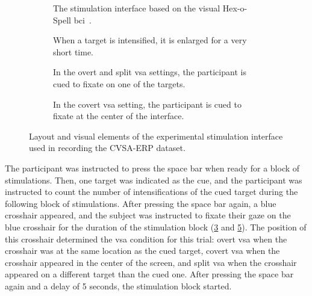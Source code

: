 \begin{figure}[t]
  \begin{subfigure}[t]{.45\textwidth}
    
    \caption[The stimulation interface.]{The stimulation interface based on the visual Hex-o-Spell
    \acs{bci}~\cite{Treder2010}.}%
    \label{fig:covert-align/interface/interface}
  \end{subfigure}\hfill%
  \begin{subfigure}[t]{.45\textwidth}
    
    \caption[Intensification.]{When a target is intensified, it is enlarged for
    a very short time.}%
    \label{fig:covert-align/interface/intensification}
  \end{subfigure}

  \bigskip

  \begin{subfigure}[t]{.45\textwidth}
    
    \caption[Gaze fixated on a target.]{In the overt and split \ac{vsa}
    settings, the
    participant is cued to fixate on one of the targets.}%
    \label{fig:covert-align/interface/overt}
  \end{subfigure}\hfill%
  \begin{subfigure}[t]{.45\textwidth}
    
    \caption[Gaze fixated centrally.]{In the covert \ac{vsa} setting, the participant is
    cued to fixate at the center of the interface.}%
    \label{fig:covert-align/interface/covert}
  \end{subfigure}
  \caption[Stimulation interface layout.]{Layout and visual elements of the experimental stimulation
  interface used in recording the CVSA-ERP dataset.}
\end{figure}

The participant was instructed to press the space bar when ready for a block
of stimulations.
Then, one target was indicated as the cue, and the participant
was instructed to count the number of intensifications of the cued target
during the following block of stimulations.
After pressing the space bar again, a blue crosshair appeared, and the subject
was instructed to fixate their gaze on the blue crosshair for the duration of
the stimulation block (\cref{fig:covert-align/interface/overt} and
\cref{fig:covert-align/interface/covert}).
The position of this crosshair determined the \ac{vsa} condition for this trial:
overt \ac{vsa} when the crosshair was at the same location as the cued target,
covert \ac{vsa} when the crosshair appeared in the center of the screen, and split
\ac{vsa} when the crosshair appeared on a different target than the cued one.
After pressing the space bar again and a delay of 5 seconds, the stimulation block
started.

